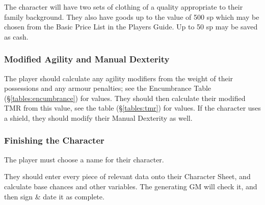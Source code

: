 \begin{multicols*}{3}
The character will have two sets of clothing of a quality appropriate
to their family background. They also have goods up to the value of
500 sp which may be chosen from the Basic Price List in the Players
Guide. Up to 50 sp may be saved as cash.

\subsubsection{Modified Agility and Manual Dexterity}

The player should calculate any agility modifiers from the weight of
their possessions and any armour penalties; see the Encumbrance Table
(\S\ref{tables:encumbrance}) for values. They should then calculate
their modified TMR from this value, see the table (\S\ref{tables:tmr})
for values. If the character uses a shield, they should modify their
Manual Dexterity as well.

\subsubsection{Finishing the Character}

The player must choose a name for their character.

They should enter every piece of relevant data onto their Character
Sheet, and calculate base chances and other variables. The generating
GM will check it, and then sign \& date it as complete.

\end{multicols*}